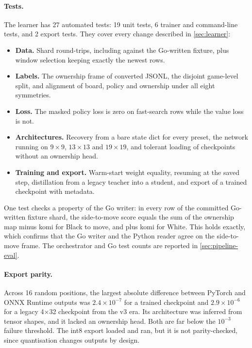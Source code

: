 \paragraph{Tests.}
The learner has 27 automated tests: 19 unit tests, 6 trainer and command-line tests, and
2 export tests. They cover every change described in \cref{sec:learner}:
\begin{itemize}
  \item \textbf{Data.} Shard round-trips, including against the Go-written fixture, plus
        window selection keeping exactly the newest rows.
  \item \textbf{Labels.} The ownership frame of converted JSONL, the disjoint game-level
        split, and alignment of board, policy and ownership under all eight symmetries.
  \item \textbf{Loss.} The masked policy loss is zero on fast-search rows while the value
        loss is not.
  \item \textbf{Architectures.} Recovery from a bare state dict for every preset, the
         network running on $9\times9$, $13\times13$ and $19\times19$, and
        tolerant loading of checkpoints without an ownership head.
  \item \textbf{Training and export.} Warm-start weight equality,  resuming
        at the saved step, distillation from a legacy teacher into a  student,
        and export of a trained  checkpoint with metadata.
\end{itemize}
One test checks a property of the Go writer: in every row of the committed Go-written
fixture shard, the side-to-move score equals the sum of the ownership map minus komi for
Black to move, and plus komi for White. This holds exactly, which confirms that the Go
writer and the Python reader agree on the side-to-move frame. The orchestrator and Go
test counts are reported in \cref{sec:pipeline-eval}.

\paragraph{Export parity.}
Across 16 random positions, the largest absolute difference between PyTorch and ONNX
Runtime outputs was $2.4\times10^{-7}$ for a trained  checkpoint and
$2.9\times10^{-6}$ for a legacy 4$\times$32 checkpoint from the v3 era. Its architecture
was inferred from tensor shapes, and it lacked an ownership head. Both are far below the
$10^{-3}$ failure threshold. The int8 export loaded and ran, but it is not
parity-checked, since quantisation changes outputs by design.

